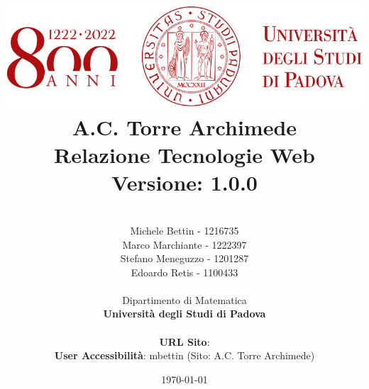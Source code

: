 \pagestyle{fancy}
    \fancyhf{}
    
    
\title{
    \includegraphics[scale=0.5]{images/logo.png} \\
    \vspace*{1in}
    {
        \Huge \textbf{A.C. Torre Archimede}}\\
        \vspace*{0.25in}
        \textbf{Relazione Tecnologie Web}\\
        \vspace{0.2in}
        \textbf{Versione: 1.0.0}\\
        \vspace{0.1in}
    }

\author{
    \begin{tabular}[t]{c@{}c}
        \hline
        \\
        Michele Bettin - 1216735\\
        Marco Marchiante - 1222397\\
        Stefano Meneguzzo - 1201287\\
        Edoardo Retis - 1100433\\
    \end{tabular}
    \vspace*{0.5in} \\
    Dipartimento di Matematica \\
    \textbf{Università degli Studi di Padova} \\
    \vspace*{0.5in} \\
    \textbf{URL Sito}:  \\
    \textbf{User Accessibilità}: mbettin (Sito: A.C. Torre Archimede)\\
} 
\date{\today}


\setlength{\oddsidemargin}{0in} \setlength{\evensidemargin}{0in}
\setlength{\topmargin}{0in}     \setlength{\headsep}{.25in}
\setlength{\textwidth}{6.5in}   \setlength{\textheight}{8.5in}
\setlength{\parindent}{1cm}